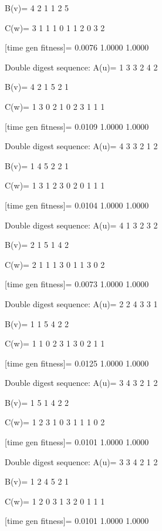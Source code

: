 B(v)=
     4     2     1     1     2     5

C(w)=
     3     1     1     1     0     1     1     2     0     3     2

[time gen fitness]=
    0.0076    1.0000    1.0000

Double digest sequence:
A(u)=
     1     3     3     2     4     2

B(v)=
     4     2     1     5     2     1

C(w)=
     1     3     0     2     1     0     2     3     1     1     1

[time gen fitness]=
    0.0109    1.0000    1.0000

Double digest sequence:
A(u)=
     4     3     3     2     1     2

B(v)=
     1     4     5     2     2     1

C(w)=
     1     3     1     2     3     0     2     0     1     1     1

[time gen fitness]=
    0.0104    1.0000    1.0000

Double digest sequence:
A(u)=
     4     1     3     2     3     2

B(v)=
     2     1     5     1     4     2

C(w)=
     2     1     1     1     3     0     1     1     3     0     2

[time gen fitness]=
    0.0073    1.0000    1.0000

Double digest sequence:
A(u)=
     2     2     4     3     3     1

B(v)=
     1     1     5     4     2     2

C(w)=
     1     1     0     2     3     1     3     0     2     1     1

[time gen fitness]=
    0.0125    1.0000    1.0000

Double digest sequence:
A(u)=
     3     4     3     2     1     2

B(v)=
     1     5     1     4     2     2

C(w)=
     1     2     3     1     0     3     1     1     1     0     2

[time gen fitness]=
    0.0101    1.0000    1.0000

Double digest sequence:
A(u)=
     3     3     4     2     1     2

B(v)=
     1     2     4     5     2     1

C(w)=
     1     2     0     3     1     3     2     0     1     1     1

[time gen fitness]=
    0.0101    1.0000    1.0000

